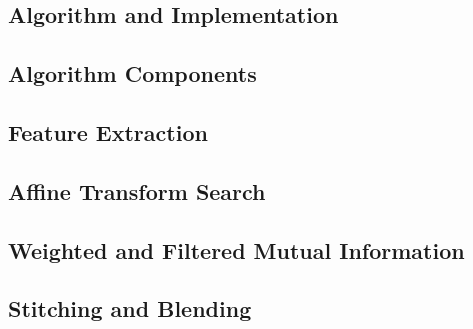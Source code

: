 \documentclass[11pt]{report}
\begin{document}
\begin{doublespace}
\indent






\chapter{Algorithm and Implementation}
\label{Ch:Algorithm}

\indent



\section{Algorithm Components}

\indent



\section{Feature Extraction}

\indent


\section{Affine Transform Search}

\indent



\section{Weighted and Filtered Mutual Information}

\indent



\section{Stitching and Blending}

\indent




\end{doublespace}
\end{document}
